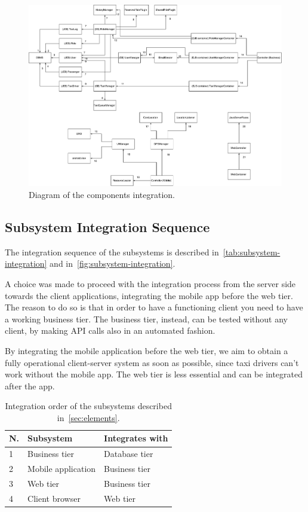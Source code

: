 \begin{figure}[h]
    \centering
    \includegraphics[width=\textwidth]{figures/components_integration.pdf}
    \caption{Diagram of the components integration.}
    \label{fig:components-integration}
\end{figure}
	

\subsection{Subsystem Integration Sequence}
The integration sequence of the subsystems is described in~\autoref{tab:subsystem-integration} and in~\autoref{fig:subsystem-integration}.

A choice was made to proceed with the integration process from the server side towards the client applications, integrating the mobile app before the web tier.
The reason to do so is that in order to have a functioning client you need to have a working business tier.
The business tier, instead, can be tested without any client, by making API calls also in an automated fashion.

By integrating the mobile application before the web tier, we aim to obtain a fully operational client-server system as soon as possible, since taxi drivers can't work without the mobile app.
The web tier is less essential and can be integrated after the app.

\begin{table}
    \centering
    \begin{tabular}{| l | l | l |}
        \hline
        N. & Subsystem & Integrates with \\
        \hline
        1 & Business tier & Database tier\\
        2 & Mobile application & Business tier\\
        3 & Web tier & Business tier\\
        4 & Client browser & Web tier\\
        \hline
    \end{tabular}
    \caption{Integration order of the subsystems described in~\autoref{sec:elements}.}
    \label{tab:subsystem-integration}
\end{table}

